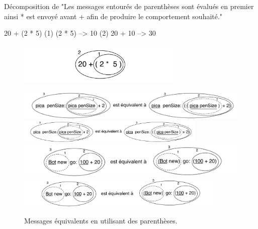 \documentclass[a4paper,10pt,twoside]{book}
\begin{document}
\begin{example}[mathcorrect]{D\'ecomposition de }{}
"Les messages entour\'es de parenth\`eses sont \'evalu\'es en premier ainsi * est envoy\'e avant + afin de produire le comportement souhait\'e."

    20 + (2 * 5) 
(1)        (2 * 5) --> 10
(2) 20 + 10      --> 30
\end{example}

\begin{figure}
\begin{center}
\includegraphics[width=8cm]{ucompoNumberBracket}
\end{center}
\end{figure}



\begin{figure}
\begin{center}
\ifluluelse
	{\includegraphics[width=\textwidth]{uKeyUnBinPar}}
	{\includegraphics[width=0.8\textwidth]{uKeyUnBinPar}}
\ifluluelse
	{\includegraphics[width=\textwidth]{uunKeyBinPar}}
	{\includegraphics[width=10cm]{uunKeyBinPar}}
\end{center}
\caption{Messages \'equivalents en utilisant des parenth\`eses. \label{fig:uKeyUnBinPar}}
\end{figure}
\end{document}
